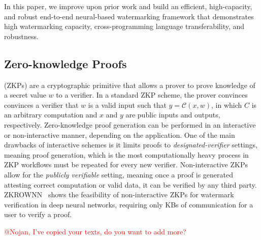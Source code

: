 In this paper, we improve upon prior work and build an efficient, high-capacity, and robust end-to-end neural-based watermarking framework that demonstrates high watermarking capacity, cross-programming language transferability, and robustness.

\subsection{Zero-knowledge Proofs}

(ZKPs) are a cryptographic primitive that allows a prover to prove knowledge of a secret value $w$ to a verifier. In a standard ZKP scheme, the prover convinces convinces a verifier that $w$ is a valid input such that $y=\mathcal{C}(x, w)$, in which $C$ is an arbitrary computation and $x$ and $y$ are public inputs and outputs, respectively. Zero-knowledge proof generation can be performed in an interactive or non-interactive manner, depending on the application. One of the main drawbacks of interactive schemes is it limits proofs to \textit{designated-verifier} settings, meaning proof generation, which is the most computationally heavy process in ZKP workflows must be repeated for every new verifier. Non-interactive ZKPs allow for the \textit{publicly verifiable} setting, meaning once a proof is generated attesting correct computation or valid data, it can be verified by any third party. ZKROWNN~\cite{sheybani2023zkrownn} shows the feasibility of non-interactive ZKPs for watermark verification in deep neural networks, requiring only KBs of communication for a user to verify a proof. 

\textcolor{red}{@Nojan, I've copied your texts, do you want to add more?}